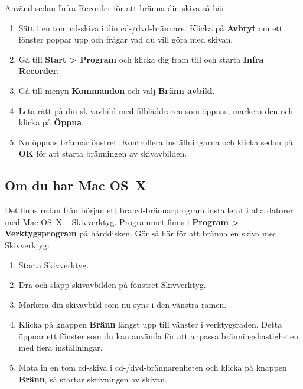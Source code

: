 \documentclass[a4paper,final]{memoir} %
\begin{document}

Använd sedan Infra Recorder för att bränna din skiva så här:

\begin{enumerate}

\item Sätt i en tom cd-skiva i din cd-/dvd-brännare. Klicka på \textbf{Avbryt} om ett fönster poppar upp och frågar vad du vill göra med skivan.

\item Gå till \textbf{Start \textgreater{} Program} och klicka dig fram till och starta \textbf{Infra Recorder}.

\item Gå till menyn \textbf{Kommandon} och välj \textbf{Bränn avbild}. 

\item Leta rätt på din skivavbild med filbläddraren som öppnas, markera den och klicka på \textbf{Öppna}.

\item Nu öppnas brännarfönstret. Kontrollera inställningarna och klicka sedan på \textbf{OK} för att starta bränningen av skivavbilden.

\end{enumerate}

\subsection{Om du har Mac OS~X}

Det finns redan från början ett bra cd-brännarprogram installerat i alla datorer med Mac OS~X -- Skivverktyg. Programmet finns i \textbf{Program \textgreater{} Verktygsprogram} på hårddisken. Gör så här för att bränna en skiva med Skivverktyg:

\begin{enumerate}
\item Starta Skivverktyg.
\item Dra och släpp skivavbilden på fönstret Skivverktyg.
\item Markera din skivavbild som nu syns i den vänstra ramen.
\item Klicka på knappen \textbf{Bränn} längst upp till vänster i verktygsraden. Detta öppnar ett fönster som du kan använda för att anpassa bränningshastigheten med flera inställningar.
\item Mata in en tom cd-skiva i cd-/dvd-brännarenheten och klicka på knappen \textbf{Bränn}, så startar skrivningen av skivan.
\end{enumerate}
\end{document}
